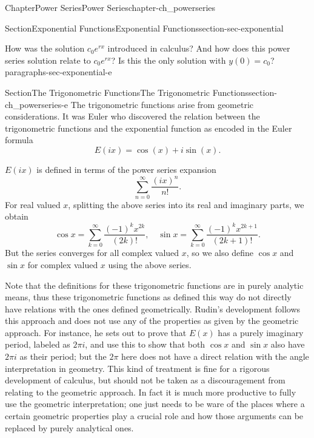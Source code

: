 \documentclass[oneside,10pt,]{book}
\numberwithin{equation}{section}
\begin{document}
\begin{chapterptx}{Chapter}{Power Series}{}{Power Series}{}{}{chapter-ch_powerseries}
\begin{sectionptx}{Section}{Exponential Functions}{}{Exponential Functions}{}{}{section-sec-exponential}
\begin{paragraphs}{How was the solution \(c_{0}e^{rx}\) introduced in calculus? And how does this power series solution relate to \(c_{0}e^{rx}\)? Is this the only solution with \(y(0)=c_{0}\)?}{paragraphs-sec-exponential-e}
\end{paragraphs}%
\end{sectionptx}
%
%
\typeout{************************************************}
\typeout{************************************************}
%
\begin{sectionptx}{Section}{The Trigonometric Functions}{}{The Trigonometric Functions}{}{}{section-ch_powerseries-e}
The trigonometric functions arise from geometric considerations. It was Euler who discovered the relation between the trigonometric functions and the exponential function as encoded in the Euler formula%
\begin{equation*}
E(ix)=\cos (x) + i \sin (x). 
\end{equation*}
%
\par
\(E(ix)\) is defined in terms of the power series expansion%
\begin{equation*}
\sum_{n=0}^{\infty} \frac{(i x)^{n}}{n!}.
\end{equation*}
For real valued \(x\), splitting the above series into its real and imaginary parts, we obtain%
\begin{equation*}
\cos x = \sum_{k=0}^{\infty}\frac{(-1)^{k} x^{2k}}{(2k)!}, \quad
\sin x= \sum_{k=0}^{\infty}\frac{(-1)^{k} x^{2k+1}}{(2k+1)!}.
\end{equation*}
But the series converges for all complex valued \(x\), so we also define \(\cos x\) and \(\sin x\) for complex valued \(x\) using the above series.%
\par
Note that the definitions for these trigonometric functions are in purely analytic means, thus these trigonometric functions as defined this way do not directly have relations with the ones defined geometrically. Rudin's development follows this  approach and does not use any of the properties as given by the geometric approach.  For instance, he sets out to prove that \(E(x)\) has a purely imaginary period, labeled as \(2\pi i\), and use this to show that both \(\cos x\) and \(\sin x\) also have \(2\pi i\) as their period; but the \(2\pi\) here does not have a direct relation with the angle interpretation in geometry.  This kind of treatment is fine for a rigorous development of calculus, but should not be taken as a discouragement from relating to the geometric approach. In fact it is much more productive to fully use the geometric interpretation; one just needs to be ware of the places where a certain geometric properties play a crucial role and how those arguments can be replaced by purely analytical ones.%

\end{sectionptx}
\end{chapterptx}
\end{document}
